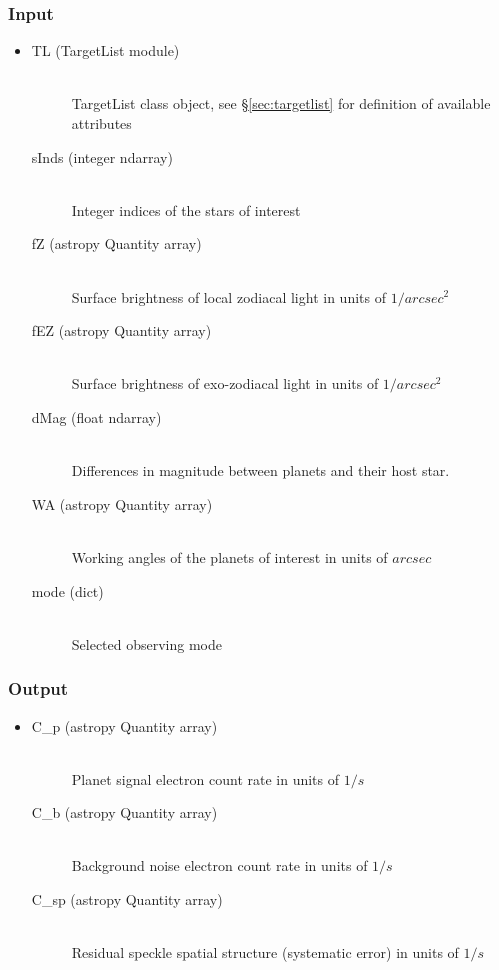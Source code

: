 \documentclass[cleanfoot]{asme2ej}
\begin{document}
\subsubsection*{Input}
\begin{itemize}
\item 
    \begin{description}
    \item[TL (TargetList module)] \hfill \\ TargetList class object, see \S\ref{sec:targetlist} for definition of available attributes
    \item[sInds (integer ndarray)] \hfill \\ Integer indices of the stars of interest
    \item[fZ (astropy Quantity array)] \hfill \\ Surface brightness of local zodiacal light in units of $ 1/arcsec^2 $
    \item[fEZ (astropy Quantity array)] \hfill \\ Surface brightness of exo-zodiacal light in units of $ 1/arcsec^2 $
    \item[dMag (float ndarray)] \hfill \\ Differences in magnitude between planets and their host star.
    \item[WA (astropy Quantity array)] \hfill \\ Working angles of the planets of interest in units of $arcsec$
    \item[mode (dict)] \hfill \\ Selected observing mode
\end{description}
\end{itemize}

\subsubsection*{Output}
\begin{itemize}
\item 
\begin{description}
    \item[C\_p (astropy Quantity array)] \hfill \\ Planet signal electron count rate in units of $ 1/s $
    \item[C\_b (astropy Quantity array)] \hfill \\ Background noise electron count rate in units of $ 1/s $
    \item[C\_sp (astropy Quantity array)] \hfill \\ Residual speckle spatial structure (systematic error) in units of $ 1/s $
\end{description}
\end{itemize}
\end{document}
